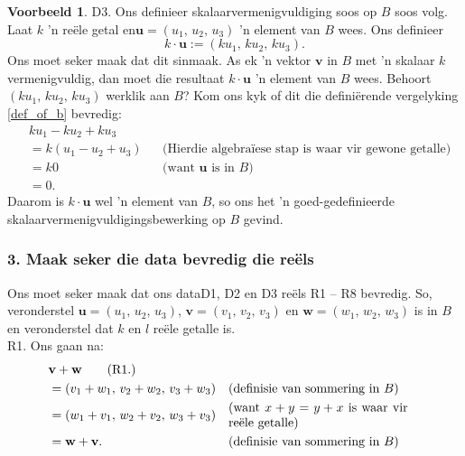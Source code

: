 \documentclass[a4paper,11pt]{book}
\theoremstyle{definition}
\newtheorem{example_environment}{Voorbeeld}[chapter]
\newcommand{\be}{\begin{equation}}
\newcommand{\ee}{\end{equation}}
\newcommand{\ve}[1]{\mathbf{#1}}
\newenvironment{example}
	{
		\begin{oframed}
		\begin{example_environment}
	}
	{
		\end{example_environment}
		\end{oframed}
	}
\begin{document}
\begin{example}
	\noindent D3. Ons definieer skalaarvermenigvuldiging soos op $B$ soos
	volg. Laat $k$ 'n re{\"e}le getal en$\ve{u} = (u_1, \, u_2, \, u_3)$
	'n element van $B$ wees. Ons definieer
	\be \label{s_mu_in_B}
	k \cdot \ve{u} := (ku_1, \, ku_2, \, ku_3).
	\ee
	Ons moet seker maak dat dit sinmaak. As ek 'n vektor $\ve{v}$ in $B$
	met 'n skalaar $k$ vermenigvuldig, dan moet die resultaat $k \cdot
	\ve{u}$ 'n element van $B$ wees. Behoort $(ku_1, \, ku_2, \, ku_3)$
	werklik aan $B$? Kom ons kyk of dit die defini{\"e}rende vergelyking
	\eqref{def_of_b} bevredig:
	\begin{align*}
		& ku_1 - ku_2 + ku_3  \\
		&= k (u_1 - u_2 + u_3) && \mbox{(Hierdie algebra{\"i}ese stap is
		waar vir gewone getalle)} \\
		&= k 0 && \mbox{(want $\ve{u}$ is in $B$)} \\
		&= 0.
	\end{align*}
	Daarom is $k \cdot \ve{u}$ wel 'n element van $B$, so ons het 'n
	goed-gedefinieerde skalaarvermenigvuldigingsbewerking op $B$ gevind.

	\subsubsection{3. Maak seker die data bevredig die re{\"e}ls}
	Ons moet seker maak dat ons dataD1, D2 en D3 re{\"e}ls R1 -- R8
	bevredig. So, veronderstel $\ve{u} = (u_1, \, u_2, \,u_3)$, $\ve{v} =
	(v_1, \, v_2, \, v_3)$ en $\ve{w} = (w_1, \, w_2, \, w_3)$ is in $B$ en
	veronderstel dat $k$ en $l$ re{\"e}le getalle is. \\

	\noindent R1. Ons gaan na:
	\begin{align*}
		& \ve{v} + \ve{w}\tag{R1.} \\
		& = (v_1 + w_1, \, v_2 + w_2, \, v_3 + w_3) && \mbox{(definisie van
		sommering in $B$)} \\
		& = (w_1 + v_1, \, w_2 + v_2, \, w_3 + v_3) &&
		\mbox{\begin{minipage}{5cm}(want  $x + y = y + x$ is waar vir
			re{\"e}le
		getalle)\end{minipage}} \\
			&= \ve{w} + \ve{v}. && \mbox{(definisie van sommering in $B$)}
	\end{align*}


\end{example}
\end{document}
